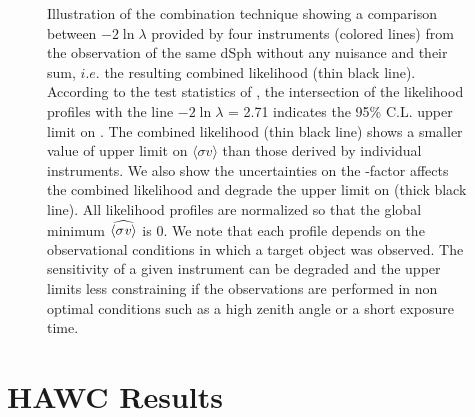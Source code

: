 \begin{figure}
\caption{Illustration of the combination technique showing a comparison between $-2\ln  \lambda$ provided by four instruments (colored lines) from the observation of the same dSph without any \J nuisance and their sum, $i.e.$ the resulting combined likelihood (thin black line). According to the test statistics of , the intersection of the likelihood profiles with the line $-2\ln  \lambda$ = 2.71 indicates the 95\% C.L. upper limit on \sv. The combined likelihood (thin black line) shows a smaller value of upper limit on $\langle \sigma v \rangle$ than those derived by individual instruments. We also show the uncertainties on the \J-factor affects the combined likelihood and degrade the upper limit on \sv (thick black line). All likelihood profiles are normalized so that the global minimum $\widehat{\langle \sigma \mathit{v} \rangle}$ is 0. We note that each profile depends on the observational conditions in which a target object was observed. The sensitivity of a given instrument can be degraded and the upper limits less constraining if the observations are performed in non optimal conditions such as a high zenith angle or a short exposure time.}
\label{fig:illustration_combination}
\end{figure}

\section{HAWC Results}\label{sec:hawc_results}

